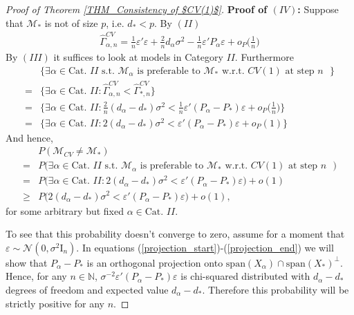 \documentclass[Research_Module_ES.tex]{subfiles}
\begin{document}
\begin{proof}[Proof of Theorem \ref{THM_Consistency of $CV(1)$}]
\textbf{Proof of $(IV)$:}
Suppose that $\mathcal{M}_\ast$ is not of size $p$, i.e. $d_\ast < p$.
By $(II)$ 
\begin{align*}
\hat{\Gamma}_{\alpha,n}^{CV} = \frac{1}{n}\varepsilon'\varepsilon + \frac{2}{n}d_\alpha\sigma^2 - \frac{1}{n}\varepsilon'P_\alpha\varepsilon + o_P\biggl(\frac{1}{n}\biggr)
\end{align*}
By $(III)$ it suffices to look at models in Category $II$.
Furthermore 
\begin{align*}
&\{ \exists\alpha\in \textrm{Cat. $II$} \textrm{ s.t. $\mathcal{M}_\alpha$ is preferable to $\mathcal{M}_\ast$ w.r.t. $CV(1)$ at step $n$ }\} \\
= &\{ \exists\alpha\in \textrm{Cat. $II$}: \hat{\Gamma}_{\alpha,n}^{CV} < \hat{\Gamma}_{\ast,n}^{CV} \} \\
= &\biggl\{ \exists\alpha\in \textrm{Cat. $II$}: \frac{2}{n}(d_\alpha-d_\ast)\sigma^2 < \frac{1}{n}\varepsilon'(P_\alpha-P_\ast)\varepsilon + o_P\biggl(\frac{1}{n}\biggr) \biggr\}\\
= &\{ \exists\alpha\in \textrm{Cat. $II$}: 2(d_\alpha-d_\ast)\sigma^2 <\varepsilon'(P_\alpha-P_\ast)\varepsilon + o_P(1) \}
\end{align*}
And hence, 
\begin{align*}
&P(\mathcal{M}_{CV}\neq \mathcal{M}_\ast) \\
= &P\bigl(\exists\alpha\in \textrm{Cat. $II$} \textrm{ s.t. $\mathcal{M}_\alpha$ is preferable to $\mathcal{M}_\ast$ w.r.t. $CV(1)$ at step $n$ }\bigr)\\
= &P\bigl(\exists\alpha\in \textrm{Cat. $II$}: 2(d_\alpha-d_\ast)\sigma^2 <\varepsilon'(P_\alpha-P_\ast)\varepsilon\bigr) + o(1)\\
\ge &P\bigl(2(d_\alpha-d_\ast)\sigma^2 <\varepsilon'(P_\alpha-P_\ast)\varepsilon\bigr) + o(1), 
\end{align*}
for some arbitrary but fixed $\alpha\in \textrm{Cat. $II$}$.

To see that this probability doesn't converge to zero, assume for a moment that $\varepsilon\sim \mathcal{N}(0,\sigma^2\mathrm{I}_n)$. In equations (\ref{projection_start})-(\ref{projection_end}) we will show that $P_\alpha-P_\ast$ is an orthogonal projection onto $\mathrm{span}(X_\alpha)\cap \mathrm{span}(X_\ast)^\bot$. Hence, for any $n\in \mathbb{N}$, $\sigma^{-2}\varepsilon'(P_\alpha-P_\ast)\varepsilon$ is chi-squared distributed with $d_\alpha-d_\ast$ degrees of freedom and expected value $d_\alpha-d_\ast$. Therefore this probability will be strictly positive for any $n$.


\end{proof}
\end{document}
